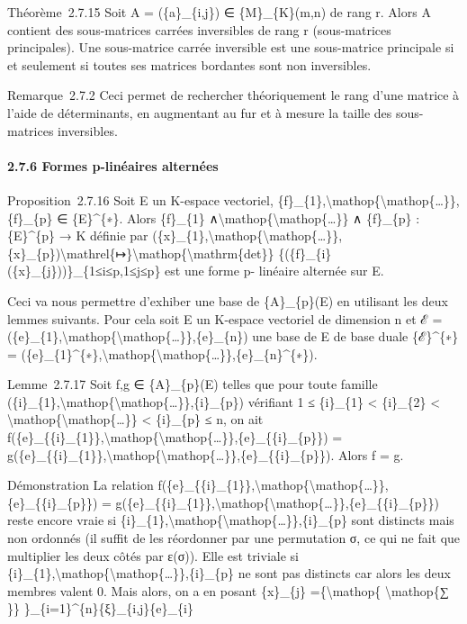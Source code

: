 \documentclass[]{article}
\begin{document}
Théorème~2.7.15 Soit A = (\{a\}\_\{i,j\}) ∈ \{M\}\_\{K\}(m,n) de rang r.
Alors A contient des sous-matrices carrées inversibles de rang r
(sous-matrices principales). Une sous-matrice carrée inversible est une
sous-matrice principale si et seulement si toutes ses matrices bordantes
sont non inversibles.

Remarque~2.7.2 Ceci permet de rechercher théoriquement le rang d'une
matrice à l'aide de déterminants, en augmentant au fur et à mesure la
taille des sous-matrices inversibles.

\paragraph{2.7.6 Formes p-linéaires alternées}

Proposition~2.7.16 Soit E un K-espace vectoriel,
\{f\}\_\{1\},\textbackslash{}mathop\{\textbackslash{}mathop\{\ldots{}\}\},\{f\}\_\{p\}
∈ \{E\}\^{}\{∗\}. Alors \{f\}\_\{1\}
∧\textbackslash{}mathop\{\textbackslash{}mathop\{\ldots{}\}\} ∧
\{f\}\_\{p\} : \{E\}\^{}\{p\} → K définie par
(\{x\}\_\{1\},\textbackslash{}mathop\{\textbackslash{}mathop\{\ldots{}\}\},\{x\}\_\{p\})\textbackslash{}mathrel\{↦\}\textbackslash{}mathop\{\textbackslash{}mathrm\{det\}\}
\{(\{f\}\_\{i\}(\{x\}\_\{j\}))\}\_\{1≤i≤p,1≤j≤p\} est une forme p-
linéaire alternée sur E.

Ceci va nous permettre d'exhiber une base de \{A\}\_\{p\}(E) en
utilisant les deux lemmes suivants. Pour cela soit E un K-espace
vectoriel de dimension n et ℰ =
(\{e\}\_\{1\},\textbackslash{}mathop\{\textbackslash{}mathop\{\ldots{}\}\},\{e\}\_\{n\})
une base de E de base duale \{ℰ\}\^{}\{∗\} =
(\{e\}\_\{1\}\^{}\{∗\},\textbackslash{}mathop\{\textbackslash{}mathop\{\ldots{}\}\},\{e\}\_\{n\}\^{}\{∗\}).

Lemme~2.7.17 Soit f,g ∈ \{A\}\_\{p\}(E) telles que pour toute famille
(\{i\}\_\{1\},\textbackslash{}mathop\{\textbackslash{}mathop\{\ldots{}\}\},\{i\}\_\{p\})
vérifiant 1 ≤ \{i\}\_\{1\} \textless{} \{i\}\_\{2\} \textless{}
\textbackslash{}mathop\{\textbackslash{}mathop\{\ldots{}\}\} \textless{}
\{i\}\_\{p\} ≤ n, on ait
f(\{e\}\_\{\{i\}\_\{1\}\},\textbackslash{}mathop\{\textbackslash{}mathop\{\ldots{}\}\},\{e\}\_\{\{i\}\_\{p\}\})
=
g(\{e\}\_\{\{i\}\_\{1\}\},\textbackslash{}mathop\{\textbackslash{}mathop\{\ldots{}\}\},\{e\}\_\{\{i\}\_\{p\}\}).
Alors f = g.

Démonstration La relation
f(\{e\}\_\{\{i\}\_\{1\}\},\textbackslash{}mathop\{\textbackslash{}mathop\{\ldots{}\}\},\{e\}\_\{\{i\}\_\{p\}\})
=
g(\{e\}\_\{\{i\}\_\{1\}\},\textbackslash{}mathop\{\textbackslash{}mathop\{\ldots{}\}\},\{e\}\_\{\{i\}\_\{p\}\})
reste encore vraie si
\{i\}\_\{1\},\textbackslash{}mathop\{\textbackslash{}mathop\{\ldots{}\}\},\{i\}\_\{p\}
sont distincts mais non ordonnés (il suffit de les réordonner par une
permutation σ, ce qui ne fait que multiplier les deux côtés par ε(σ)).
Elle est triviale si
\{i\}\_\{1\},\textbackslash{}mathop\{\textbackslash{}mathop\{\ldots{}\}\},\{i\}\_\{p\}
ne sont pas distincts car alors les deux membres valent 0. Mais alors,
on a en posant \{x\}\_\{j\} =\{\textbackslash{}mathop\{
\textbackslash{}mathop\{∑ \}\}
\}\_\{i=1\}\^{}\{n\}\{ξ\}\_\{i,j\}\{e\}\_\{i\}
\end{document}
